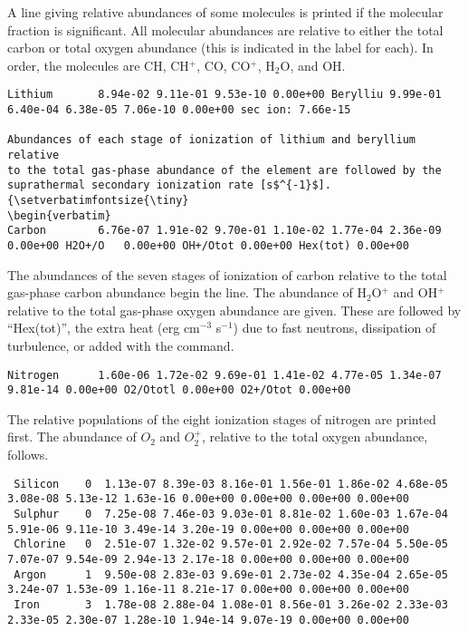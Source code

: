 A line giving relative abundances of some molecules is printed if the
molecular fraction is significant.
All molecular abundances are relative
to either the total carbon or total oxygen abundance (this is indicated
in the label for each).
In order, the molecules are CH, CH$^+$, CO,
CO$^+$, H$_2$O, and OH.
{\setverbatimfontsize{\tiny}
\begin{verbatim}
Lithium       8.94e-02 9.11e-01 9.53e-10 0.00e+00 Berylliu 9.99e-01 6.40e-04 6.38e-05 7.06e-10 0.00e+00 sec ion: 7.66e-15

Abundances of each stage of ionization of lithium and beryllium relative
to the total gas-phase abundance of the element are followed by the
suprathermal secondary ionization rate [s$^{-1}$].
{\setverbatimfontsize{\tiny}
\begin{verbatim}
Carbon        6.76e-07 1.91e-02 9.70e-01 1.10e-02 1.77e-04 2.36e-09 0.00e+00 H2O+/O   0.00e+00 OH+/Otot 0.00e+00 Hex(tot) 0.00e+00
\end{verbatim}
}
The abundances of the seven stages of ionization of carbon relative to
the total gas-phase carbon abundance begin the line.
The abundance of H$_2$O$^+$
and OH$^+$ relative to the total gas-phase oxygen abundance are given.  These
are followed by ``Hex(tot)'', the extra heat  (erg cm$^{-3}$ s$^{-1}$) due to fast
neutrons, dissipation of turbulence, or added with the
 command.
{\setverbatimfontsize{\tiny}
\begin{verbatim}
Nitrogen      1.60e-06 1.72e-02 9.69e-01 1.41e-02 4.77e-05 1.34e-07 9.81e-14 0.00e+00 O2/Ototl 0.00e+00 O2+/Otot 0.00e+00
\end{verbatim}
}

The relative populations of the eight ionization stages of nitrogen are
printed first.
The abundance of $O_2$ and $O_2^+$, relative to the total oxygen
abundance, follows.
{\setverbatimfontsize{\tiny}
\begin{verbatim}
 Silicon    0  1.13e-07 8.39e-03 8.16e-01 1.56e-01 1.86e-02 4.68e-05 3.08e-08 5.13e-12 1.63e-16 0.00e+00 0.00e+00 0.00e+00 0.00e+00
 Sulphur    0  7.25e-08 7.46e-03 9.03e-01 8.81e-02 1.60e-03 1.67e-04 5.91e-06 9.11e-10 3.49e-14 3.20e-19 0.00e+00 0.00e+00 0.00e+00
 Chlorine   0  2.51e-07 1.32e-02 9.57e-01 2.92e-02 7.57e-04 5.50e-05 7.07e-07 9.54e-09 2.94e-13 2.17e-18 0.00e+00 0.00e+00 0.00e+00
 Argon      1  9.50e-08 2.83e-03 9.69e-01 2.73e-02 4.35e-04 2.65e-05 3.24e-07 1.53e-09 1.16e-11 8.21e-17 0.00e+00 0.00e+00 0.00e+00
 Iron       3  1.78e-08 2.88e-04 1.08e-01 8.56e-01 3.26e-02 2.33e-03 2.33e-05 2.30e-07 1.28e-10 1.94e-14 9.07e-19 0.00e+00 0.00e+00
\end{verbatim}
}

